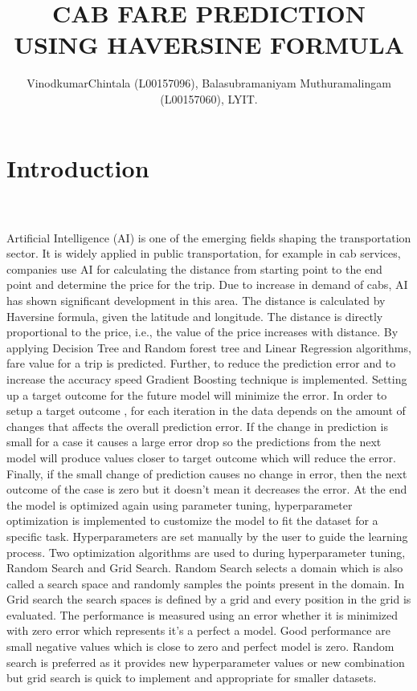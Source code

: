\documentclass[journal,twoside,web]{ieeecolor}
\begin{document}
\title{CAB FARE PREDICTION USING HAVERSINE FORMULA}
\author{VinodkumarChintala (L00157096), Balasubramaniyam Muthuramalingam (L00157060), LYIT.
}

\maketitle

\section{Introduction}
\label{Introduction}
\IEEEPARstart

\\
\\

Artificial Intelligence (AI) is one of the emerging fields shaping the transportation sector. It is widely applied in public transportation, for example in cab services, companies use AI for calculating the distance from starting point to the end point and determine the price for the trip. Due to increase in demand of cabs, AI has shown significant development in this area. The distance is calculated by Haversine formula, given the latitude and longitude. The distance is directly proportional to the price, i.e., the value of the price increases with distance. By applying Decision Tree and Random forest tree and Linear Regression  algorithms, fare value for a trip is predicted. Further, to reduce the prediction error and to increase the accuracy speed Gradient Boosting technique is implemented. Setting up a target outcome for the future model will minimize the error. In order to setup a target outcome , for each iteration in the data depends on the amount of changes that affects the overall prediction error. If the change in prediction is small for a case it causes a large error drop so the predictions from the next model will produce values closer to target outcome which will reduce the error. Finally, if the small change of prediction causes no change in error, then the next outcome of the case is zero but it doesn’t mean it decreases the error.
At the end the model is optimized again using parameter tuning, hyperparameter optimization is implemented to customize the model to fit the dataset for a specific task. Hyperparameters are set manually by the user to guide the learning process. Two optimization algorithms are used to during hyperparameter tuning, Random Search and Grid Search. Random Search selects a domain which is also called a search space and randomly samples the points present in the domain. In Grid search the search spaces is defined by a grid and every position in the grid is evaluated. The performance is measured using an error whether it is minimized with zero error which represents it’s a perfect a model. Good performance are small negative values which is close to zero and perfect model is zero. Random search is preferred as it provides new hyperparameter values or new combination but grid search is quick to implement and appropriate for smaller datasets.
\\
\end{document}
